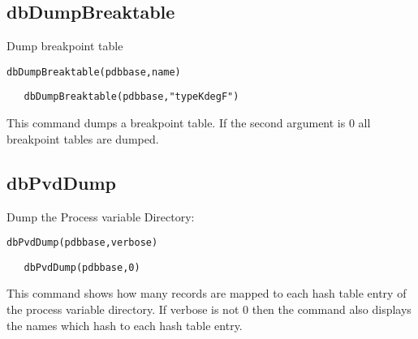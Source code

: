 \subsection{dbDumpBreaktable}

Dump breakpoint table

\begin{verbatim}
dbDumpBreaktable(pdbbase,name)
\end{verbatim}

\begin{verbatim}
   dbDumpBreaktable(pdbbase,"typeKdegF")
\end{verbatim}

This command dumps a breakpoint table. If the second argument is 0 all breakpoint tables are dumped.

\subsection{dbPvdDump}

Dump the Process variable Directory:

\begin{verbatim}
dbPvdDump(pdbbase,verbose)
\end{verbatim}

\begin{verbatim}
   dbPvdDump(pdbbase,0)
\end{verbatim}

This command shows how many records are mapped to each hash table entry of the process variable directory. If verbose 
is not 0 then the command also displays the names which hash to each hash table entry.

